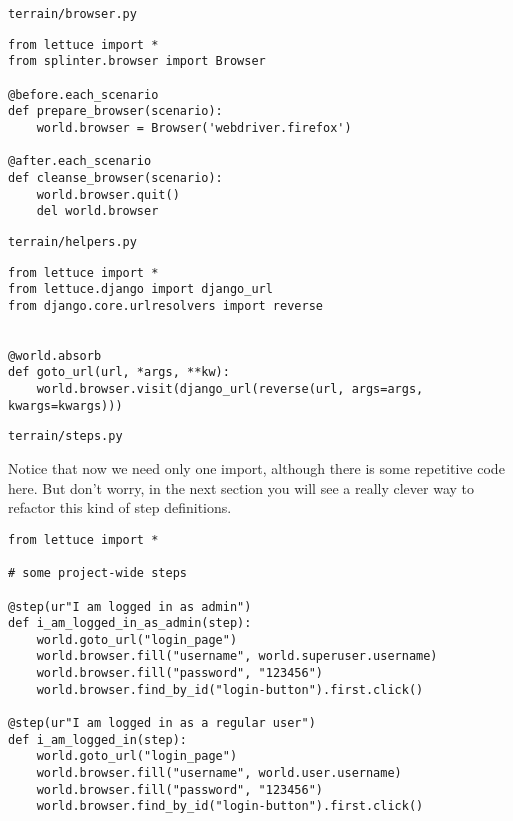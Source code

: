 \documentclass[letterpaper]{article}
\begin{document}
\hspace{2pt}

\noindent
\large\texttt{terrain/browser.py}\footnotesize
\newline
\begin{verbatim}
from lettuce import *
from splinter.browser import Browser

@before.each_scenario
def prepare_browser(scenario):
    world.browser = Browser('webdriver.firefox')

@after.each_scenario
def cleanse_browser(scenario):
    world.browser.quit()
    del world.browser
\end{verbatim}

\newpage
\noindent
\large\texttt{terrain/helpers.py}\footnotesize
\newline
\begin{verbatim}
from lettuce import *
from lettuce.django import django_url
from django.core.urlresolvers import reverse


@world.absorb
def goto_url(url, *args, **kw):
    world.browser.visit(django_url(reverse(url, args=args, kwargs=kwargs)))
\end{verbatim}

\hspace{2pt}

\noindent
\large\texttt{terrain/steps.py}\footnotesize

\hspace{1pt}

\noindent
Notice that now we need only one import, although there is some
repetitive code here. But don't worry, in the next section you will
see a really clever way to refactor this kind of step definitions.

\begin{verbatim}
from lettuce import *

# some project-wide steps

@step(ur"I am logged in as admin")
def i_am_logged_in_as_admin(step):
    world.goto_url("login_page")
    world.browser.fill("username", world.superuser.username)
    world.browser.fill("password", "123456")
    world.browser.find_by_id("login-button").first.click()

@step(ur"I am logged in as a regular user")
def i_am_logged_in(step):
    world.goto_url("login_page")
    world.browser.fill("username", world.user.username)
    world.browser.fill("password", "123456")
    world.browser.find_by_id("login-button").first.click()
\end{verbatim}
\normalsize
\end{document}

